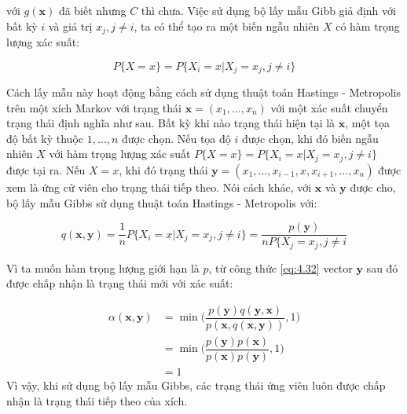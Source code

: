 \documentclass[14pt, a4paper]{article}
\numberwithin{equation}{section}
\numberwithin{figure}{section}
\theoremstyle{sltheorem}
\theoremstyle{soltheorem}
\numberwithin{dl}{section}
\numberwithin{md}{section}
\numberwithin{vd}{section}
\begin{document}
    với $g(\mathbf{x})$ đã biết nhưng $C$ thì chưa. Việc sử dụng bộ lấy mẫu Gibb giả định với bất kỳ $i$ và giá trị $x_j, j \neq i$, ta có thể tạo ra một biến ngẫu nhiên $X$ có hàm trọng lượng xác suất:

    \begin{equation*}
        P \lbrace X = x \rbrace = P \lbrace X_i = x \vert X_j = x_j, j \neq i \rbrace
    \end{equation*}

    Cách lấy mẫu này hoạt động bằng cách sử dụng thuật toán Hastings - Metropolis trên một xích Markov với trạng thái $\mathbf{x}=(x_1, \dots, x_n)$ với một xác suất chuyển trạng thái định nghĩa như sau.
    Bất kỳ khi nào trạng thái hiện tại là $\mathbf{x}$, một tọa độ bất kỳ thuộc $1, \dots, n$ được chọn.
    Nếu tọa độ $i$ được chọn, khi đó biến ngẫu nhiên $X$ với hàm trọng lượng xác suất $P \lbrace X = x \rbrace = P \lbrace X_i = x \vert X_j = x_j, j \neq i \rbrace$ được tại ra.
    Nếu $X=x$, khi đó trạng thái $\mathbf{y}=(x_1, \dots, x_{i-1}, x, x_{i+1}, \dots, x_n)$ được xem là ứng cử viên cho trạng thái tiếp theo.
    Nói cách khác, với $\mathbf{x}$ và $\mathbf{y}$ được cho, bộ lấy mẫu Gibbs sử dụng thuật toán Hastings - Metropolis với:

    \begin{equation*}
        q(\mathbf{x}, \mathbf{y}) = \dfrac{1}{n} P \lbrace X_i = x \vert X_j = x_j, j \neq i \rbrace = \dfrac{p(\mathbf{y})}{n P \lbrace X_j = x_j, j \neq i}
    \end{equation*}

    Vì ta muốn hàm trọng lượng giới hạn là $p$, từ công thức \ref{eq:4.32} vector $\mathbf{y}$ sau đó được chấp nhận là trạng thái mới với xác suất:

    \begin{equation*}
        \begin{aligned}
            \alpha (\mathbf{x}, \mathbf{y}) &= \min \Bigg ( \dfrac{p(\mathbf{y}) q(\mathbf{y}, \mathbf{x})}{p(\mathbf{x}, q(\mathbf{x}, \mathbf{y}))}, 1 \Bigg ) \\
            &= \min \Bigg ( \dfrac{p(\mathbf{y})p(\mathbf{x})}{p(\mathbf{x})p(\mathbf{y})}, 1 \Bigg) \\
            &= 1
        \end{aligned}
    \end{equation*}
    Vì vậy, khi sử dụng bộ lấy mẫu Gibbs, các trạng thái ứng viên luôn được chấp nhận là trạng thái tiếp theo của xích.
\end{document}
